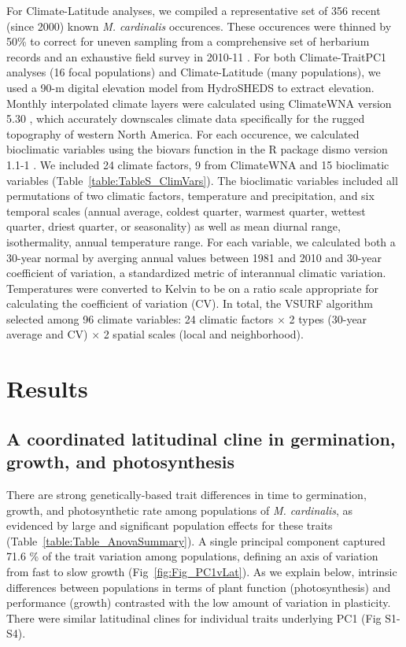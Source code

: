 \documentclass[11pt, oneside]{article}
\newcommand{\pkg}[1]{{\fontseries{b}\selectfont #1}}
\begin{document}
For Climate-Latitude analyses, we compiled a representative set of 356 recent (since 2000) known \textit{M. cardinalis} occurences. These occurences were thinned by 50\% to correct for uneven sampling from a comprehensive set of herbarium records and an exhaustive field survey in 2010-11 \citep{Angert_ENM}. For both Climate-TraitPC1 analyses (16 focal populations) and Climate-Latitude (many populations), we used a 90-m digital elevation model from HydroSHEDS \citep{Lehner_etal_2006} to extract elevation. Monthly interpolated climate layers were calculated using ClimateWNA version 5.30 \citep{Wang_etal_2012}, which accurately downscales climate data specifically for the rugged topography of western North America. For each occurence, we calculated bioclimatic variables using the biovars function in the R package \pkg{dismo} version 1.1-1 \citep{Hijmans_etal_2016}. We included 24 climate factors, 9 from ClimateWNA and 15 bioclimatic variables (Table~\ref{table:TableS_ClimVars}). The bioclimatic variables included all permutations of two climatic factors, temperature and precipitation, and six temporal scales (annual average, coldest quarter, warmest quarter, wettest quarter, driest quarter, or seasonality) as well as mean diurnal range, isothermality, annual temperature range. For each variable, we calculated both a 30-year normal by averging annual values between 1981 and 2010 and 30-year coefficient of variation, a standardized metric of interannual climatic variation. Temperatures were converted to Kelvin to be on a ratio scale appropriate for calculating the coefficient of variation (CV). In total, the VSURF algorithm selected among 96 climate variables: 24 climatic factors $\times$ 2 types (30-year average and CV) $\times$ 2 spatial scales (local and neighborhood).


\section*{Results}

\subsection*{A coordinated latitudinal cline in germination, growth, and photosynthesis}

There are strong genetically-based trait differences in time to germination, growth, and photosynthetic rate among populations of \textit{M. cardinalis}, as evidenced by large and significant population effects for these traits (Table~\ref{table:Table_AnovaSummary}). A single principal component captured 71.6 \% of the trait variation among populations, defining an axis of variation from fast to slow growth (Fig~\ref{fig:Fig_PC1vLat}). As we explain below, intrinsic differences between populations in terms of plant function (photosynthesis) and performance (growth) contrasted with the low amount of variation in plasticity. There were similar latitudinal clines for individual traits underlying PC1 (Fig S1-S4).
\end{document}
